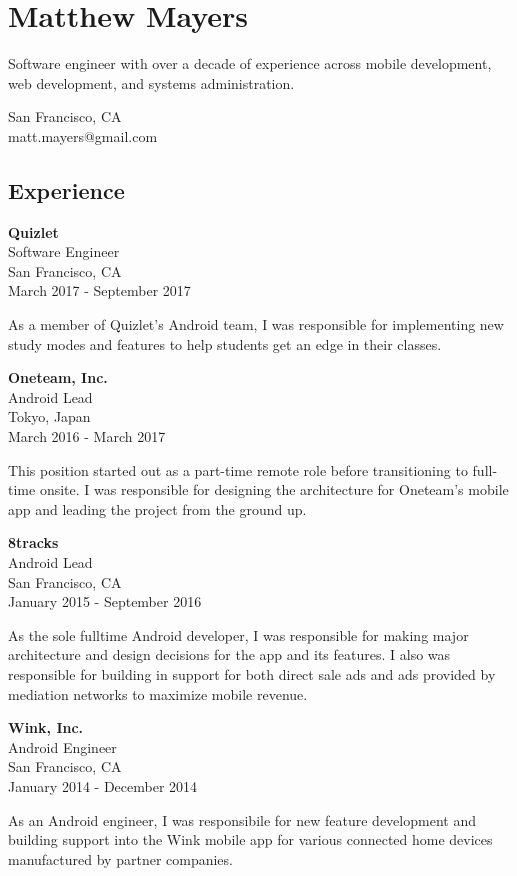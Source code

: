 \documentclass[]{article}
\date{}
\begin{document}
\section{Matthew Mayers}\label{matthew-mayers}

Software engineer with over a decade of experience across mobile
development, web development, and systems administration.

San Francisco, CA\\
matt.mayers@gmail.com

\subsection{Experience}\label{experience}

\textbf{Quizlet}\\
Software Engineer\\
San Francisco, CA\\
March 2017 - September 2017

As a member of Quizlet's Android team, I was responsible for
implementing new study modes and features to help students get an edge
in their classes.

\textbf{Oneteam, Inc.}\\
Android Lead\\
Tokyo, Japan\\
March 2016 - March 2017

This position started out as a part-time remote role before
transitioning to full-time onsite. I was responsible for designing the
architecture for Oneteam's mobile app and leading the project from the
ground up.

\textbf{8tracks}\\
Android Lead\\
San Francisco, CA\\
January 2015 - September 2016

As the sole fulltime Android developer, I was responsible for making
major architecture and design decisions for the app and its features. I
also was responsible for building in support for both direct sale ads
and ads provided by mediation networks to maximize mobile revenue.

\textbf{Wink, Inc.}\\
Android Engineer\\
San Francisco, CA\\
January 2014 - December 2014

As an Android engineer, I was responsibile for new feature development
and building support into the Wink mobile app for various connected home
devices manufactured by partner companies.
\end{document}
